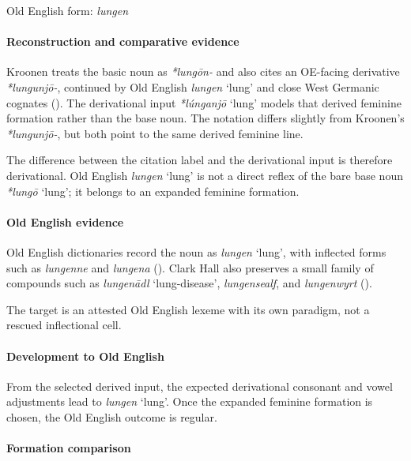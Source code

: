 \documentclass[
  british,
  a4paper,
]{article}
\providecommand{\Recon}[1]{\emph{*#1}}
\begin{document}
Old English form: \emph{lungen}

\paragraph{Reconstruction and comparative
evidence}\label{reconstruction-and-comparative-evidence-96}

Kroonen treats the basic noun as \emph{*lungōn-} and also cites an
OE-facing derivative \emph{*lungunjō-}, continued by Old English
{\emph{lungen}} `lung' and close West Germanic cognates
(). The derivational input
\Recon{lúnganjō} `lung' models that derived feminine formation rather
than the base noun. The notation differs slightly from Kroonen's
\emph{*lungunjō-}, but both point to the same derived feminine line.

The difference between the citation label and the derivational input is
therefore derivational. Old English {\emph{lungen}} `lung' is not a
direct reflex of the bare base noun \Recon{lungō} `lung'; it belongs to
an expanded feminine formation.

\paragraph{Old English evidence}\label{old-english-evidence-96}

Old English dictionaries record the noun as {\emph{lungen}} `lung', with
inflected forms such as \emph{lungenne} and \emph{lungena}
().
Clark Hall also preserves a small family of compounds such as
\emph{lungenādl} `lung-disease', \emph{lungensealf}, and
\emph{lungenwyrt} ().

The target is an attested Old English lexeme with its own paradigm, not
a rescued inflectional cell.

\paragraph{Development to Old
English}\label{development-to-old-english-96}

From the selected derived input, the expected derivational consonant and
vowel adjustments lead to {\emph{lungen}} `lung'. Once the expanded
feminine formation is chosen, the Old English outcome is regular.

\paragraph{Formation comparison}\label{formation-comparison-3}
\end{document}
